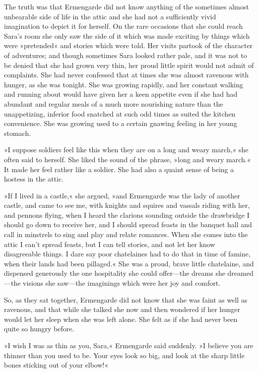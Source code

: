 The truth was that Ermengarde did not know anything of the sometimes almost unbearable side of life in the attic and she had not a sufficiently vivid imagination to depict it for herself. On the rare occasions that she could reach Sara's room she only saw the side of it which was made exciting by things which were »pretended« and stories which were told. Her visits partook of the character of adventures; and though sometimes Sara looked rather pale, and it was not to be denied that she had grown very thin, her proud little spirit would not admit of complaints. She had never confessed that at times she was almost ravenous with hunger, as she was tonight. She was growing rapidly, and her constant walking and running about would have given her a keen appetite even if she had had abundant and regular meals of a much more nourishing nature than the unappetizing, inferior food snatched at such odd times as suited the kitchen convenience. She was growing used to a certain gnawing feeling in her young stomach.

»I suppose soldiers feel like this when they are on a long and weary march,« she often said to herself. She liked the sound of the phrase, »long and weary march.« It made her feel rather like a soldier. She had also a quaint sense of being a hostess in the attic.

»If I lived in a castle,« she argued, »and Ermengarde was the lady of another castle, and came to see me, with knights and squires and vassals riding with her, and pennons flying, when I heard the clarions sounding outside the drawbridge I should go down to receive her, and I should spread feasts in the banquet hall and call in minstrels to sing and play and relate romances. When she comes into the attic I can't spread feasts, but I can tell stories, and not let her know disagreeable things. I dare say poor chatelaines had to do that in time of famine, when their lands had been pillaged.« She was a proud, brave little chatelaine, and dispensed generously the one hospitality she could offer—the dreams she dreamed—the visions she saw—the imaginings which were her joy and comfort.

So, as they sat together, Ermengarde did not know that she was faint as well as ravenous, and that while she talked she now and then wondered if her hunger would let her sleep when she was left alone. She felt as if she had never been quite so hungry before.

»I wish I was as thin as you, Sara,« Ermengarde said suddenly. »I believe you are thinner than you used to be. Your eyes look so big, and look at the sharp little bones sticking out of your elbow!«

